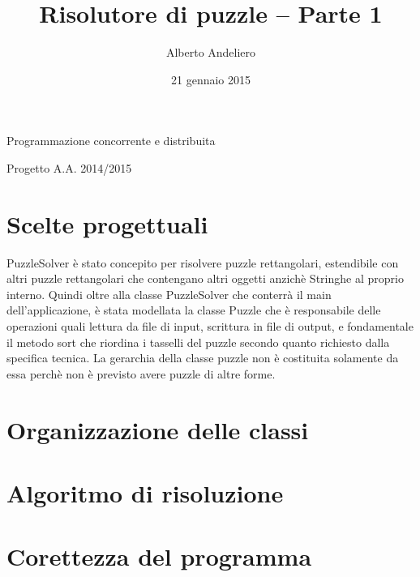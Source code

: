 \documentclass[12pt]{article}
\title{Risolutore di puzzle – Parte 1}
\author{Alberto Andeliero}
\date{21 gennaio 2015}
\begin{document}
\maketitle
\centerline{Programmazione concorrente e distribuita}
\centerline{Progetto A.A. 2014/2015}
\section{Scelte progettuali}
PuzzleSolver è stato concepito per risolvere puzzle rettangolari, estendibile con altri puzzle rettangolari che contengano altri oggetti anzichè Stringhe al proprio interno. Quindi oltre alla classe PuzzleSolver che conterrà il main dell'applicazione, è stata modellata la classe Puzzle che è responsabile delle operazioni quali lettura da file di input, scrittura in file di output, e fondamentale il metodo sort che riordina i tasselli del puzzle secondo quanto richiesto dalla specifica tecnica. La gerarchia della classe puzzle non è 
costituita solamente da essa perchè non è previsto avere puzzle di altre forme. 
\section{Organizzazione delle classi}
\section{Algoritmo di risoluzione}
\section{Corettezza del programma}
\end{document}

